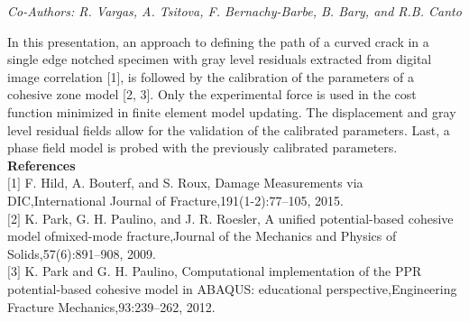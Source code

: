 \begin{center}
\textit{Co-Authors: R. Vargas, A. Tsitova, F. Bernachy-Barbe, B. Bary, and R.B. Canto}
\end{center} 
In this presentation, an approach to defining the path of a curved crack in a single edge notched specimen with gray level residuals extracted from digital image correlation [1], is followed by the calibration of the parameters of a cohesive zone model [2, 3]. Only the experimental force is used in the cost function minimized in finite element model updating. The displacement and gray level residual fields allow for the validation of the calibrated parameters. Last, a phase field model is probed with the previously calibrated parameters.\\

\noindent\textbf{References}\\
$[$1$]$ F. Hild, A. Bouterf, and S. Roux, Damage Measurements via DIC,International Journal of Fracture,191(1-2):77–105, 2015.\\\newline
$[$2$]$ K. Park, G. H. Paulino, and J. R. Roesler, A unified potential-based cohesive model ofmixed-mode fracture,Journal of the Mechanics and Physics of Solids,57(6):891–908, 2009.\\\newline
$[$3$]$ K. Park and G. H. Paulino, Computational implementation of the PPR potential-based cohesive model in ABAQUS: educational perspective,Engineering Fracture Mechanics,93:239–262, 2012.
